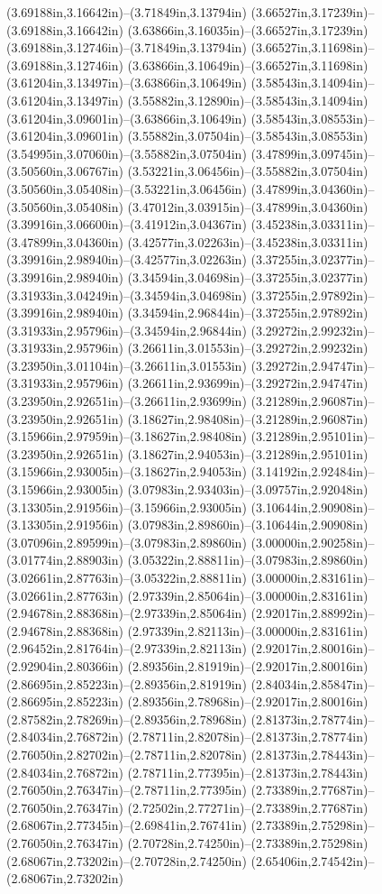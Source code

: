 (3.69188in,3.16642in)--(3.71849in,3.13794in) (3.66527in,3.17239in)--(3.69188in,3.16642in) (3.63866in,3.16035in)--(3.66527in,3.17239in) (3.69188in,3.12746in)--(3.71849in,3.13794in) (3.66527in,3.11698in)--(3.69188in,3.12746in) (3.63866in,3.10649in)--(3.66527in,3.11698in) (3.61204in,3.13497in)--(3.63866in,3.10649in) (3.58543in,3.14094in)--(3.61204in,3.13497in) (3.55882in,3.12890in)--(3.58543in,3.14094in) (3.61204in,3.09601in)--(3.63866in,3.10649in) (3.58543in,3.08553in)--(3.61204in,3.09601in) (3.55882in,3.07504in)--(3.58543in,3.08553in) (3.54995in,3.07060in)--(3.55882in,3.07504in) (3.47899in,3.09745in)--(3.50560in,3.06767in) (3.53221in,3.06456in)--(3.55882in,3.07504in) (3.50560in,3.05408in)--(3.53221in,3.06456in) (3.47899in,3.04360in)--(3.50560in,3.05408in) (3.47012in,3.03915in)--(3.47899in,3.04360in) (3.39916in,3.06600in)--(3.41912in,3.04367in) (3.45238in,3.03311in)--(3.47899in,3.04360in) (3.42577in,3.02263in)--(3.45238in,3.03311in) (3.39916in,2.98940in)--(3.42577in,3.02263in) (3.37255in,3.02377in)--(3.39916in,2.98940in) (3.34594in,3.04698in)--(3.37255in,3.02377in) (3.31933in,3.04249in)--(3.34594in,3.04698in) (3.37255in,2.97892in)--(3.39916in,2.98940in) (3.34594in,2.96844in)--(3.37255in,2.97892in) (3.31933in,2.95796in)--(3.34594in,2.96844in) (3.29272in,2.99232in)--(3.31933in,2.95796in) (3.26611in,3.01553in)--(3.29272in,2.99232in) (3.23950in,3.01104in)--(3.26611in,3.01553in) (3.29272in,2.94747in)--(3.31933in,2.95796in) (3.26611in,2.93699in)--(3.29272in,2.94747in) (3.23950in,2.92651in)--(3.26611in,2.93699in) (3.21289in,2.96087in)--(3.23950in,2.92651in) (3.18627in,2.98408in)--(3.21289in,2.96087in) (3.15966in,2.97959in)--(3.18627in,2.98408in) (3.21289in,2.95101in)--(3.23950in,2.92651in) (3.18627in,2.94053in)--(3.21289in,2.95101in) (3.15966in,2.93005in)--(3.18627in,2.94053in) (3.14192in,2.92484in)--(3.15966in,2.93005in) (3.07983in,2.93403in)--(3.09757in,2.92048in) (3.13305in,2.91956in)--(3.15966in,2.93005in) (3.10644in,2.90908in)--(3.13305in,2.91956in) (3.07983in,2.89860in)--(3.10644in,2.90908in) (3.07096in,2.89599in)--(3.07983in,2.89860in) (3.00000in,2.90258in)--(3.01774in,2.88903in) (3.05322in,2.88811in)--(3.07983in,2.89860in) (3.02661in,2.87763in)--(3.05322in,2.88811in) (3.00000in,2.83161in)--(3.02661in,2.87763in) (2.97339in,2.85064in)--(3.00000in,2.83161in) (2.94678in,2.88368in)--(2.97339in,2.85064in) (2.92017in,2.88992in)--(2.94678in,2.88368in) (2.97339in,2.82113in)--(3.00000in,2.83161in) (2.96452in,2.81764in)--(2.97339in,2.82113in) (2.92017in,2.80016in)--(2.92904in,2.80366in) (2.89356in,2.81919in)--(2.92017in,2.80016in) (2.86695in,2.85223in)--(2.89356in,2.81919in) (2.84034in,2.85847in)--(2.86695in,2.85223in) (2.89356in,2.78968in)--(2.92017in,2.80016in) (2.87582in,2.78269in)--(2.89356in,2.78968in) (2.81373in,2.78774in)--(2.84034in,2.76872in) (2.78711in,2.82078in)--(2.81373in,2.78774in) (2.76050in,2.82702in)--(2.78711in,2.82078in) (2.81373in,2.78443in)--(2.84034in,2.76872in) (2.78711in,2.77395in)--(2.81373in,2.78443in) (2.76050in,2.76347in)--(2.78711in,2.77395in) (2.73389in,2.77687in)--(2.76050in,2.76347in) (2.72502in,2.77271in)--(2.73389in,2.77687in) (2.68067in,2.77345in)--(2.69841in,2.76741in) (2.73389in,2.75298in)--(2.76050in,2.76347in) (2.70728in,2.74250in)--(2.73389in,2.75298in) (2.68067in,2.73202in)--(2.70728in,2.74250in) (2.65406in,2.74542in)--(2.68067in,2.73202in) 